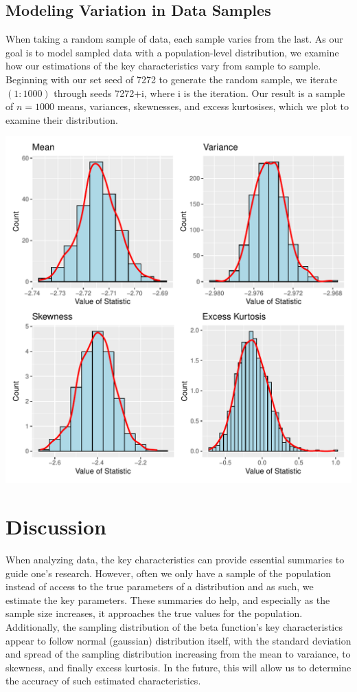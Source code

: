 \documentclass{article}\usepackage[]{graphicx}\usepackage[]{xcolor}
\makeatletter
\def\maxwidth{ %
  \ifdim\Gin@nat@width>\linewidth
    \linewidth
  \else
    \Gin@nat@width
  \fi
}
\newenvironment{knitrout}{}{} %
\makeatother
\begin{document}
\begin{multicols}{2}
\subsection{Modeling Variation in Data Samples}
When taking a random sample of data, each sample varies from the last. As our goal is to model sampled data with a population-level distribution, we examine how our estimations of the key characteristics vary from sample to sample. Beginning with our set seed of 7272 to generate the random sample, we iterate $(1:1000)$ through seeds 7272+i, where i is the iteration. Our result is a sample of $n = 1000$ means, variances, skewnesses, and excess kurtosises, which we plot to examine their distribution.

\begin{knitrout}\scriptsize
{}\color{fgcolor}
\includegraphics[width=\maxwidth]{figure/unnamed-chunk-3-1} 
\end{knitrout}


\section{Discussion}
When analyzing data, the key characteristics can provide essential summaries to guide one's research. However, often we only have a sample of the population instead of access to the true parameters of a distribution and as such, we estimate the key parameters. These summaries do help, and especially as the sample size increases, it approaches the true values for the population. Additionally, the sampling distribution of the beta function's key characteristics appear to follow normal (gaussian) distribution itself, with the standard deviation and spread of the sampling distribution increasing from the mean to varaiance, to skewness, and finally excess kurtosis. In the future, this will allow us to determine the accuracy of such estimated characteristics. 


\end{multicols}
\end{document}
